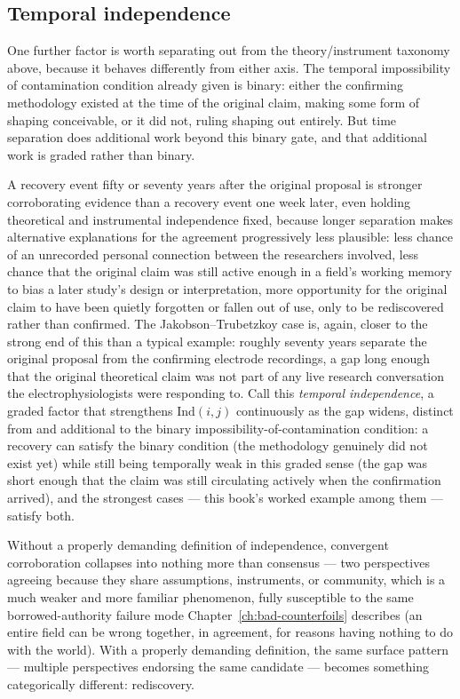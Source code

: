 \subsection*{Temporal independence}

One further factor is worth separating out from the theory/instrument taxonomy above, because it behaves differently from either axis. The temporal impossibility of contamination condition already given is binary: either the confirming methodology existed at the time of the original claim, making some form of shaping conceivable, or it did not, ruling shaping out entirely. But time separation does additional work beyond this binary gate, and that additional work is graded rather than binary.

A recovery event fifty or seventy years after the original proposal is stronger corroborating evidence than a recovery event one week later, even holding theoretical and instrumental independence fixed, because longer separation makes alternative explanations for the agreement progressively less plausible: less chance of an unrecorded personal connection between the researchers involved, less chance that the original claim was still active enough in a field's working memory to bias a later study's design or interpretation, more opportunity for the original claim to have been quietly forgotten or fallen out of use, only to be rediscovered rather than confirmed. The Jakobson--Trubetzkoy case is, again, closer to the strong end of this than a typical example: roughly seventy years separate the original proposal from the confirming electrode recordings, a gap long enough that the original theoretical claim was not part of any live research conversation the electrophysiologists were responding to. Call this \emph{temporal independence}, a graded factor that strengthens $\mathrm{Ind}(i,j)$ continuously as the gap widens, distinct from and additional to the binary impossibility-of-contamination condition: a recovery can satisfy the binary condition (the methodology genuinely did not exist yet) while still being temporally weak in this graded sense (the gap was short enough that the claim was still circulating actively when the confirmation arrived), and the strongest cases --- this book's worked example among them --- satisfy both.

Without a properly demanding definition of independence, convergent corroboration collapses into nothing more than consensus --- two perspectives agreeing because they share assumptions, instruments, or community, which is a much weaker and more familiar phenomenon, fully susceptible to the same borrowed-authority failure mode Chapter~\ref{ch:bad-counterfoils} describes (an entire field can be wrong together, in agreement, for reasons having nothing to do with the world). With a properly demanding definition, the same surface pattern --- multiple perspectives endorsing the same candidate --- becomes something categorically different: rediscovery.

